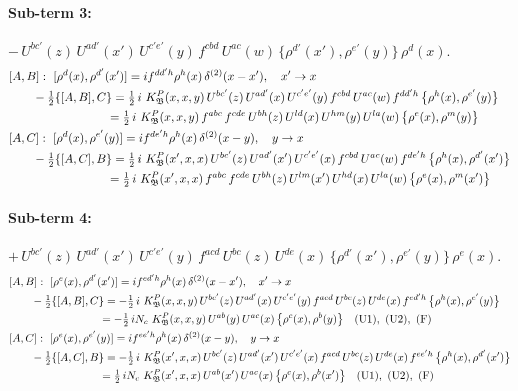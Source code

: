 \documentclass[10pt]{article}
\numberwithin{equation}{section}
\begin{document}
\paragraph{Sub-term 3:} $-\,U^{bc'}(z)\,U^{ad'}(x')\,U^{c'e'}(y)\,f^{cbd}\,U^{ac}(w)\,\big\{\rho^{d'}(x'),\rho^{e'}(y)\big\}\,\rho^{d}(x)$.
\begin{align}
&[A,B]:\ [\rho^{d}(x),\rho^{d'}(x')]=i f^{dd'h}\rho^{h}(x)\,\delta^{(2)}(x-x'),\quad x'\to x\notag\\
&\qquad -\tfrac12\{[A,B],C\}=\tfrac12\,i\,\,K^{P}_{\mathfrak B}(x,x,y)\,U^{bc'}(z)\,U^{ad'}(x)\,U^{c'e'}(y)\,f^{cbd}\,U^{ac}(w)\,f^{dd'h}\,\big\{\rho^{h}(x),\rho^{e'}(y)\big\}\notag\\
&\qquad\phantom{-\tfrac12\{[A,B],C\}}=\tfrac12\,i\,\,K^{P}_{\mathfrak B}(x,x,y)\,f^{abc}\,f^{cde}\,U^{bh}(z)\,U^{ld}(x)\,U^{hm}(y)\,U^{la}(w)\,\big\{\rho^{e}(x),\rho^{m}(y)\big\}
\label{eq:GII.I1.P-3-AB}\\
&[A,C]:\ [\rho^{d}(x),\rho^{e'}(y)]=i f^{de'h}\rho^{h}(x)\,\delta^{(2)}(x-y),\quad y\to x\notag\\
&\qquad -\tfrac12\{[A,C],B\}=\tfrac12\,i\,\,K^{P}_{\mathfrak B}(x',x,x)\,U^{bc'}(z)\,U^{ad'}(x')\,U^{c'e'}(x)\,f^{cbd}\,U^{ac}(w)\,f^{de'h}\,\big\{\rho^{h}(x),\rho^{d'}(x')\big\}\notag\\
&\qquad\phantom{-\tfrac12\{[A,C],B\}}=\tfrac12\,i\,\,K^{P}_{\mathfrak B}(x',x,x)\,f^{abc}\,f^{cde}\,U^{bh}(z)\,U^{lm}(x')\,U^{hd}(x)\,U^{la}(w)\,\big\{\rho^{e}(x),\rho^{m}(x')\big\}
\label{eq:GII.I1.P-3-AC}
\end{align}
\paragraph{Sub-term 4:} $+\,U^{bc'}(z)\,U^{ad'}(x')\,U^{c'e'}(y)\,f^{acd}\,U^{bc}(z)\,U^{de}(x)\,\big\{\rho^{d'}(x'),\rho^{e'}(y)\big\}\,\rho^{e}(x)$.
\begin{align}
&[A,B]:\ [\rho^{e}(x),\rho^{d'}(x')]=i f^{ed'h}\rho^{h}(x)\,\delta^{(2)}(x-x'),\quad x'\to x\notag\\
&\qquad -\tfrac12\{[A,B],C\}=-\tfrac12\,i\,\,K^{P}_{\mathfrak B}(x,x,y)\,U^{bc'}(z)\,U^{ad'}(x)\,U^{c'e'}(y)\,f^{acd}\,U^{bc}(z)\,U^{de}(x)\,f^{ed'h}\,\big\{\rho^{h}(x),\rho^{e'}(y)\big\}\notag\\
&\qquad\phantom{-\tfrac12\{[A,B],C\}}=-\tfrac12\,i N_{c}\,\,K^{P}_{\mathfrak B}(x,x,y)\,U^{ab}(y)\,U^{ac}(x)\,\big\{\rho^{c}(x),\rho^{b}(y)\big\}\quad\text{(U1)},\ \text{(U2)},\ \text{(F)}
\label{eq:GII.I1.P-4-AB}\\
&[A,C]:\ [\rho^{e}(x),\rho^{e'}(y)]=i f^{ee'h}\rho^{h}(x)\,\delta^{(2)}(x-y),\quad y\to x\notag\\
&\qquad -\tfrac12\{[A,C],B\}=-\tfrac12\,i\,\,K^{P}_{\mathfrak B}(x',x,x)\,U^{bc'}(z)\,U^{ad'}(x')\,U^{c'e'}(x)\,f^{acd}\,U^{bc}(z)\,U^{de}(x)\,f^{ee'h}\,\big\{\rho^{h}(x),\rho^{d'}(x')\big\}\notag\\
&\qquad\phantom{-\tfrac12\{[A,C],B\}}=\tfrac12\,i N_{c}\,\,K^{P}_{\mathfrak B}(x',x,x)\,U^{ab}(x')\,U^{ac}(x)\,\big\{\rho^{c}(x),\rho^{b}(x')\big\}\quad\text{(U1)},\ \text{(U2)},\ \text{(F)}
\label{eq:GII.I1.P-4-AC}
\end{align}
\end{document}
